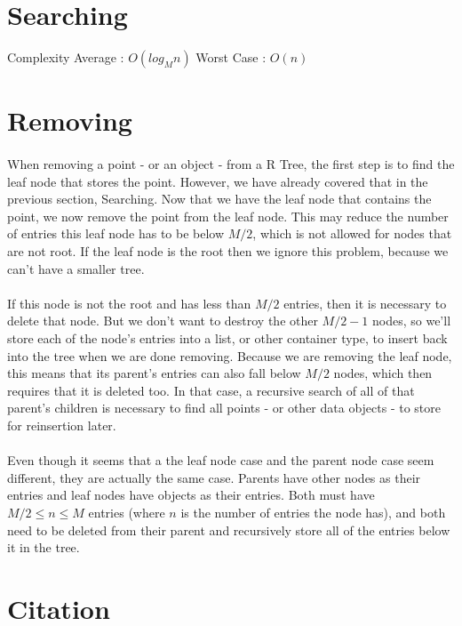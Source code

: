 \documentclass{article}
\begin{document}
\section{Searching}
Complexity
Average : $O(log_Mn)$
Worst Case : $O(n)$

\section{Removing}
\paragraph{}
When removing a point - or an object - from a R Tree, the first step is to find the leaf node that stores the point.
However, we have already covered that in the previous section, Searching. Now that we have the leaf node that contains
the point, we now remove the point from the leaf node. This may reduce the number of entries this leaf node has to be below
$M/2$, which is not allowed for nodes that are not root. If the leaf node is the root then we ignore this problem, because
we can't have a smaller tree.
\paragraph{}
If this node is not the root and has less than $M/2$ entries, then it is necessary to delete that node. But we don't want to destroy
the other $M/2 - 1$ nodes, so we'll store each of the node's entries into a list, or other container type, to insert back into
the tree when we are done removing. Because we are removing the leaf node, this means that its parent's entries can also fall below
$M/2$ nodes, which then requires that it is deleted too. In that case, a recursive search of all of that parent's children is necessary
to find all points - or other data objects - to store for reinsertion later.
\paragraph{}
Even though it seems that a the leaf node case and the parent node case seem different, they are actually the same case. Parents have
other nodes as their entries and leaf nodes have objects as their entries. Both must have $M/2 \le n \le M$ entries (where $n$ is the number
of entries the node has), and both need to be deleted from their parent and recursively store all of the entries below it in the tree.

\section{Citation}


\end{document}
